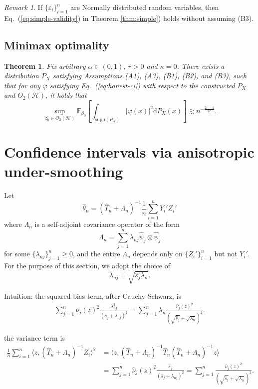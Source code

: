 \documentclass[11pt,a4paper]{article}
\renewcommand{\hat}{\widehat}
\theoremstyle{definition}
\theoremstyle{plain}
\newtheorem{theorem}{Theorem}[section]
\theoremstyle{remark}
\newtheorem{remark}{Remark}[section]
\newcommand{\supp}{\mathrm{supp}}
\newcommand{\ud}{\mathrm d}
\newcommand{\mH}{\mathcal H}
\begin{document}
\begin{remark}
If $\{\varepsilon_i\}_{i=1}^n$ are Normally distributed random variables, then Eq.~(\ref{eq:simple-validity}) in Theorem \ref{thm:simple}) holds without assuming (B3).
\end{remark}


\subsection{Minimax optimality}

\begin{theorem}
Fix arbitrary $\alpha\in(0,1)$, $r>0$ and $\kappa=0$. There exists a distribution $P_X$ satisfying Assumptions (A1), (A3), (B1), (B2), and (B3), such that for any $\varphi$ satisfying Eq.~(\ref{eq:honest-ci})
with respect to the constructed $P_X$ and $\Theta_2(\mH)$, it holds that
$$
\sup_{\beta_0\in\Theta_2(\mH)} \mathbb E_{\beta_0}\left[\int_{\supp(P_X)}\big|\varphi(x)\big|^2\ud P_X(x)\right] \gtrsim n^{-\frac{2r-1}{2r}}.
$$
\label{thm:simple-lb}
\end{theorem}

\section{Confidence intervals via anisotropic under-smoothing}

Let
$$
\hat\theta_n = (\hat T_n+\Lambda_n)^{-1}\frac{1}{n}\sum_{i=1}^n Y_i' Z_i'
$$
where $\Lambda_n$ is a self-adjoint covariance operator of the form
$$
\Lambda_n = \sum_{j=1}^n \lambda_{nj}\hat\psi_j\otimes\hat\psi_j
$$
for some $\{\lambda_{nj}\}_{j=1}^n\geq 0$, and the entire $\Lambda_n$ depends only on $\{Z_i'\}_{i=1}^n$ but not $Y_i'$.
For the purpose of this section, we adopt the choice of 
$$
\lambda_{nj} = \sqrt{\hat s_j\lambda_n}.
$$

{\color{blue}
Intuition: the squared bias term, after Cauchy-Schwarz, is
\begin{align*}
\sum_{j=1}^n \hat\nu_j(z)^2\frac{\lambda_{nj}^2}{(s_j+\lambda_{nj})^2} = \sum_{j=1}^n \lambda_n \frac{\hat\nu_j(z)^2}{(\sqrt{\hat s_j}+\sqrt{\lambda_n})^2}.
\end{align*}

the variance term is
\begin{align*}
\frac{1}{n}\sum_{i=1}^n\langle z, (\hat T_n+\Lambda_n)^{-1}Z_i\rangle^2 &= \langle z, (\hat T_n+\Lambda_n)^{-1}\hat T_n(\hat T_n+\Lambda_n)^{-1}z\rangle\\
&= \sum_{j=1}^n \hat\nu_j(z)^2\frac{\hat s_j}{(\hat s_j+\lambda_{nj})^2} = \sum_{j=1}^n \frac{\hat\nu_j(z)^2}{(\sqrt{\hat s_j}+\sqrt{\lambda_n})^2}.
\end{align*}
}
\end{document}
